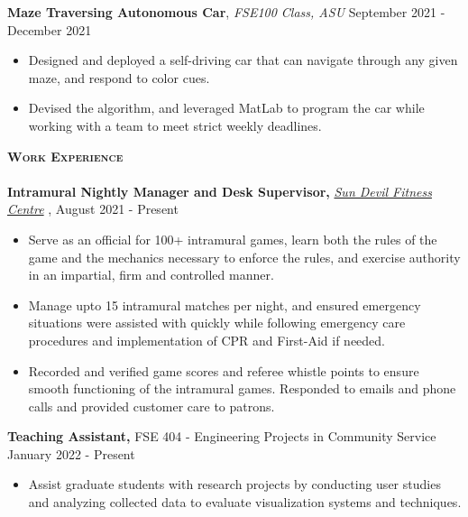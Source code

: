 \documentclass[a4paper]{article}
\newcommand{\lineunder} {
    \vspace*{-8pt} \\
    \hspace*{-18pt} \hrulefill \\
}
\newcommand{\header} [1] {
    {\hspace*{-15pt}\vspace*{3pt} \textsc{#1}}
    \vspace*{-6pt} \lineunder
}
\begin{document}
{\begin{itemize}
\end{itemize}

\textbf{Maze Traversing Autonomous Car}, \textit{FSE100 Class, ASU}
\hfill September 2021 - December 2021\\
\vspace{-3mm}
\begin{itemize}
    \item Designed and deployed a self-driving car that can navigate through any given maze, and respond to color cues. 
    \item Devised the algorithm, and leveraged MatLab to program the car while working with a team to meet strict weekly deadlines. 
\end{itemize}

\vspace{-1mm}
    \header{\textbf{Work Experience}}

\textbf{Intramural Nightly Manager and Desk Supervisor, } \textit{{\href{https://fitness.asu.edu/programs/intramurals}{Sun Devil Fitness Centre}} \faExternalLink},   \hfill August 2021 - Present\\
\vspace{-3mm}
\begin{itemize}
    \item Serve as an official for 100+ intramural games, learn both the rules of the game and the mechanics necessary to enforce the rules, and exercise authority in an impartial, firm and controlled manner. 
    \item Manage upto 15 intramural matches per night, and ensured emergency situations were assisted with quickly while following emergency care procedures and implementation of CPR and First-Aid if needed.  
    \item Recorded and verified game scores and referee whistle points to ensure smooth functioning of the intramural games. Responded to emails and phone calls and provided customer care to patrons.
\end{itemize}

    \textbf{Teaching Assistant, } {FSE 404 - Engineering Projects in Community Service} \hfill January 2022 - Present\\
\vspace{-3mm}
\begin{itemize}
    \item Assist graduate students with research projects by conducting user studies and analyzing collected data to evaluate visualization systems and techniques. 
\end{itemize}

}
\end{document}

